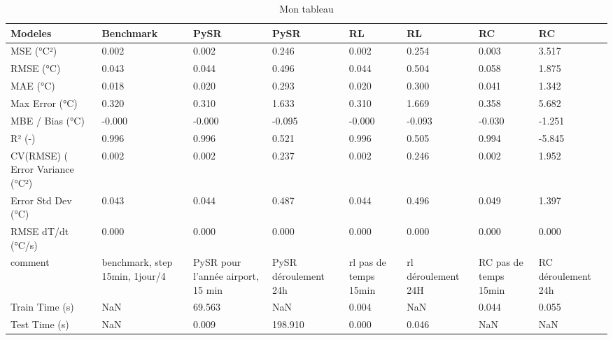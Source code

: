 \begin{table}
\caption{Mon tableau}
\label{tab:mon_tableau}
\begin{tabular}{llllllll}
\toprule
Modeles & Benchmark & PySR & PySR & RL & RL & RC & RC \\
\midrule
MSE (°C²) & 0.002 & 0.002 & 0.246 & 0.002 & 0.254 & 0.003 & 3.517 \\
RMSE (°C) & 0.043 & 0.044 & 0.496 & 0.044 & 0.504 & 0.058 & 1.875 \\
MAE (°C) & 0.018 & 0.020 & 0.293 & 0.020 & 0.300 & 0.041 & 1.342 \\
Max Error (°C) & 0.320 & 0.310 & 1.633 & 0.310 & 1.669 & 0.358 & 5.682 \\
MBE / Bias (°C) & -0.000 & -0.000 & -0.095 & -0.000 & -0.093 & -0.030 & -1.251 \\
R² (-) & 0.996 & 0.996 & 0.521 & 0.996 & 0.505 & 0.994 & -5.845 \\
CV(RMSE) (%
Error Variance (°C²) & 0.002 & 0.002 & 0.237 & 0.002 & 0.246 & 0.002 & 1.952 \\
Error Std Dev (°C) & 0.043 & 0.044 & 0.487 & 0.044 & 0.496 & 0.049 & 1.397 \\
RMSE dT/dt (°C/s) & 0.000 & 0.000 & 0.000 & 0.000 & 0.000 & 0.000 & 0.000 \\
comment & benchmark, step 15min, 1jour/4 & PySR pour l'année airport, 15 min & PySR déroulement 24h & rl pas de temps 15min & rl déroulement 24H & RC pas de temps 15min & RC déroulement 24h \\
Train Time (s) & NaN & 69.563 & NaN & 0.004 & NaN & 0.044 & 0.055 \\
Test Time (s) & NaN & 0.009 & 198.910 & 0.000 & 0.046 & NaN & NaN \\
\bottomrule
\end{tabular}
\end{table}

